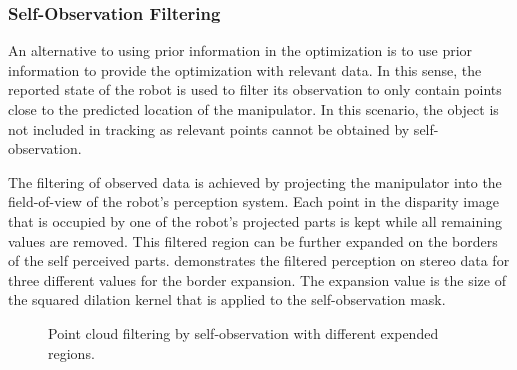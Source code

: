 \subsubsection{Self-Observation Filtering}

An alternative to using prior information in the optimization is to use prior information to provide the optimization with relevant data. In this sense, the reported state of the robot is used to filter its observation to only contain points close to the predicted location of the manipulator. In this scenario, the object is not included in tracking as relevant points cannot be obtained by self-observation.

The filtering of observed data is achieved by projecting the manipulator into the field-of-view of the robot's perception system. Each point in the disparity image that is occupied by one of the robot's projected parts is kept while all remaining values are removed. This filtered region can be further expanded on the borders of the self perceived parts.  demonstrates the filtered perception on stereo data for three different values for the border expansion. The expansion value is the size of the squared dilation kernel that is applied to the self-observation mask.

\begin{figure}[h]
\centering
{}
\caption{Point cloud filtering by self-observation with different expended regions.}
\label{fig:self_observation_region}
\end{figure}


